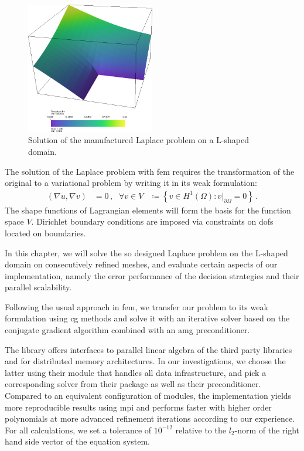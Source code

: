 \begin{figure}
\centering
\includegraphics[width=0.5\textwidth]{figures/results/solution.png}
\caption{Solution of the manufactured Laplace problem on a L-shaped domain.}
\label{fig:solution}
\end{figure}

The solution of the Laplace problem with \gls{fem} requires the transformation of the original to a variational problem by writing it in its weak formulation:
\begin{align}
\left(\nabla u, \nabla v\right) &= 0 \,\text{,} & \forall v \in V &\coloneqq \left\{ v \in H^1(\Omega): v|_{\partial\Omega} = 0 \right\} \,\text{.}
\end{align}
The shape functions of Lagrangian elements will form the basis for the function space $V$. Dirichlet boundary conditions are imposed via constraints on \glspl{dof} located on boundaries.

In this chapter, we will solve the so designed Laplace problem on the L-shaped domain on consecutively refined meshes, and evaluate certain aspects of our implementation, namely the error performance of the decision strategies and their parallel scalability.

Following the usual approach in \gls{fem}, we transfer our problem to its weak formulation using \gls{cg} methods and solve it with an iterative solver based on the conjugate gradient algorithm combined with an \gls{amg} preconditioner.

The \dealii{} library offers interfaces to parallel linear algebra of the third party libraries \petsc{} \textcite{petsc3124} and \trilinos{} \textcite{trilinos12181} for distributed memory architectures. In our investigations, we choose the latter using their \epetra{}
module that handles all data infrastructure, and pick a corresponding solver from their \aztecoo{}
package as well as their \ml{}
preconditioner. Compared to an equivalent configuration of \petsc{} modules, the \trilinos{} implementation yields more reproducible results using \gls{mpi} \parencite[FAQ]{petsc3124} and performs faster with higher order polynomials at more advanced refinement iterations according to our experience. For all calculations, we set a tolerance of $10^{-12}$ relative to the $l_2$-norm of the right hand side vector of the equation system.





